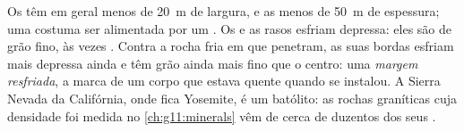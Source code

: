 Os  têm em geral menos de \qty{20}{m} de largura, e as  menos
de \qty{50}{m} de espessura; uma  costuma ser alimentada por um
. Os  e as  rasos esfriam depressa: eles são de grão
fino, às vezes . Contra a rocha fria em que penetram, as suas
bordas esfriam mais depressa ainda e têm grão ainda mais fino que o centro:
uma \emph{margem resfriada}, a marca de um corpo que estava quente quando se
instalou. A Sierra Nevada da Califórnia, onde fica Yosemite, é um batólito:
as rochas graníticas cuja densidade foi medida no \cref{ch:g11:minerals} vêm
de cerca de duzentos dos seus .

